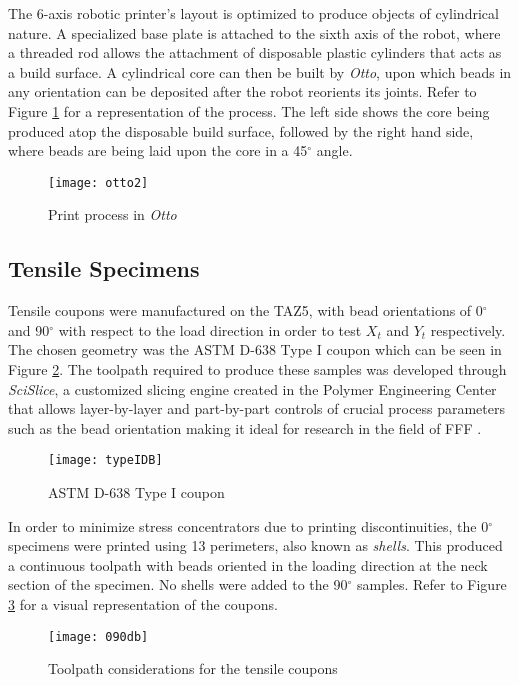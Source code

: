 \documentclass[main.tex]{subfiles}
\begin{document}
The 6-axis robotic printer's layout is optimized to produce objects of cylindrical nature. A specialized base plate is attached to the sixth axis of the robot, where a threaded rod allows the attachment of disposable plastic cylinders that acts as a build surface. A cylindrical core can then be built by \emph{Otto}, upon which beads in any orientation can be deposited after the robot reorients its joints. Refer to Figure \ref{fig:otto2} for a representation of the process. The left side shows the core being produced atop the disposable build surface, followed by the right hand side, where beads are being laid upon the core in a 45$^\circ$ angle.  
\begin{figure}[h]
	\center
	\texttt{[image: otto2]}
	\caption{Print process in \emph{Otto}} \label{fig:otto2}
\end{figure}

\subsection{Tensile Specimens}
Tensile coupons were manufactured on the TAZ5, with bead orientations of 0$^\circ$ and 90$^\circ$ with respect to the load direction in order to test $X_t$ and $Y_t$ respectively. The chosen geometry was the ASTM D-638 Type I coupon \cite{ASTMD638} which can be seen in Figure \ref{fig:db}. The toolpath required to produce these samples was developed through \emph{SciSlice}, a customized slicing engine created in the Polymer Engineering Center that allows layer-by-layer and part-by-part controls of crucial process parameters \textemdash such as the bead orientation \textemdash making it ideal for research in the field of FFF \cite{VanHulle2017a}.

\begin{figure}[h]
	\center
	\texttt{[image: typeIDB]}
	\caption{ASTM D-638 Type I coupon} \label{fig:db}
\end{figure}

In order to minimize stress concentrators due to printing discontinuities, the 0$^\circ$ specimens were printed using 13 perimeters, also known as \emph {shells}. This produced a continuous toolpath with beads oriented in the loading direction at the neck section of the specimen. No shells were added to the 90$^\circ$ samples. Refer to Figure \ref{fig:090db} for a visual representation of the coupons. 

\begin{figure}[h]
	\center
	\texttt{[image: 090db]}
	\caption{Toolpath considerations for the tensile coupons} \label{fig:090db}
\end{figure}
\end{document}
